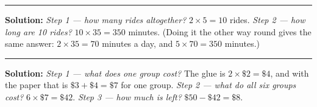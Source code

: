 \documentclass[12pt]{article}
\begin{document}
\vspace{0.2cm}\noindent\rule{\linewidth}{0.2pt}


\textbf{Solution:} \emph{Step 1 --- how many rides altogether?}
$2 \times 5 = 10$ rides.
\emph{Step 2 --- how long are 10 rides?} $10 \times 35 = 350$ minutes.
(Doing it the other way round gives the same answer: $2 \times 35 = 70$ minutes a day,
and $5 \times 70 = 350$ minutes.)

\vspace{0.2cm}\noindent\rule{\linewidth}{0.2pt}


\textbf{Solution:} \emph{Step 1 --- what does one group cost?} The glue is
$2 \times \$2 = \$4$, and with the paper that is $\$3 + \$4 = \$7$ for one group.
\emph{Step 2 --- what do all six groups cost?} $6 \times \$7 = \$42$.
\emph{Step 3 --- how much is left?} $\$50 - \$42 = \$8$.
\end{document}
